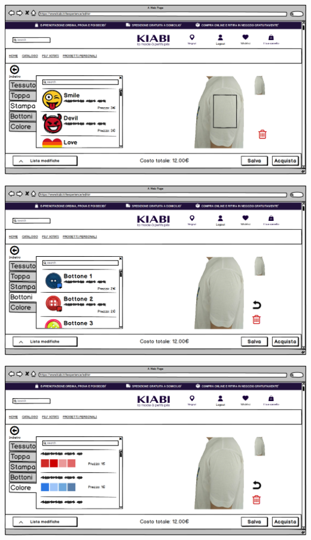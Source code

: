 \documentclass[12pt,italian,]{report}
\begin{document}
\includegraphics{balsamiq/Editor - caratteristica maniche stampa.png}


\includegraphics{balsamiq/Editor - caratteristica maniche bottoni.png}


\includegraphics{balsamiq/Editor - caratteristica maniche colore.png}
\end{document}
